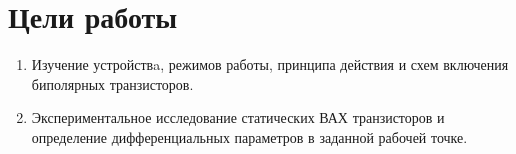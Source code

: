 \section{Цели работы}


\begin{enumerate}
  \item Изучение устройствa, режимов работы, принципа действия и схем включения биполярных транзисторов. 
  \item Экспериментальное исследование статических ВАХ транзисторов и определение дифференциальных параметров в заданной рабочей точке.
\end{enumerate}

